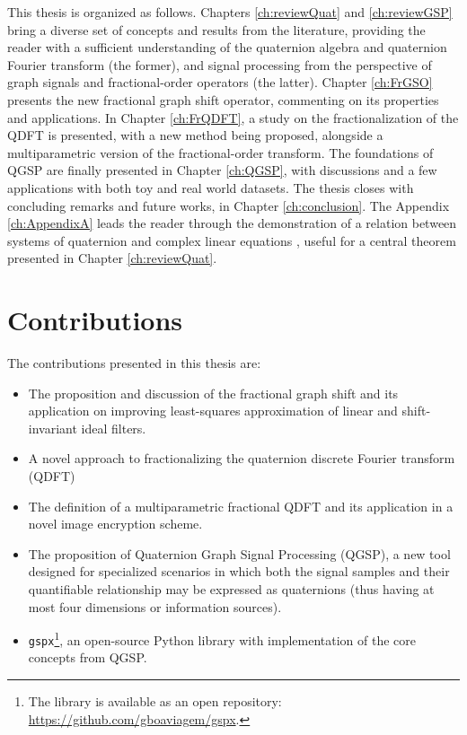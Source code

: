 This thesis is organized as follows. Chapters \ref{ch:reviewQuat} and \ref{ch:reviewGSP} bring a diverse set of concepts and results from the literature, providing the reader with a sufficient understanding of the quaternion algebra and quaternion Fourier transform (the former), and signal processing from the perspective of graph signals and fractional-order operators (the latter).
Chapter \ref{ch:FrGSO} presents the new fractional graph shift operator, commenting on its properties and applications.
In Chapter \ref{ch:FrQDFT}, a study on the fractionalization of the QDFT is presented, with a new method being proposed, alongside a multiparametric version of the fractional-order transform.
The foundations of QGSP are finally presented in Chapter \ref{ch:QGSP}, with discussions and a few applications with both toy  and real world datasets.
The thesis closes with concluding remarks and future works, in Chapter \ref{ch:conclusion}. The Appendix \ref{ch:AppendixA} leads the reader through the demonstration of a relation between systems of quaternion and complex linear equations , useful for a central theorem presented in Chapter \ref{ch:reviewQuat}.

\section{Contributions}
The contributions presented in this thesis are:

\begin{itemize}[noitemsep]
    \item The proposition and discussion of the fractional graph shift and its application on improving least-squares approximation of linear and shift-invariant ideal filters.
    \item A novel approach to fractionalizing the quaternion discrete Fourier transform (QDFT)
    \item The definition of a multiparametric fractional QDFT and its application in a novel image encryption scheme.
    \item The proposition of Quaternion Graph Signal Processing (QGSP), a new tool designed for specialized scenarios in which both the signal samples and their quantifiable relationship may be expressed as quaternions (thus having at most four dimensions or information sources).
    \item \texttt{gspx}\footnote{The library is available as an open repository: \url{https://github.com/gboaviagem/gspx}.}, an open-source Python library with implementation of the core concepts from QGSP.
\end{itemize}

